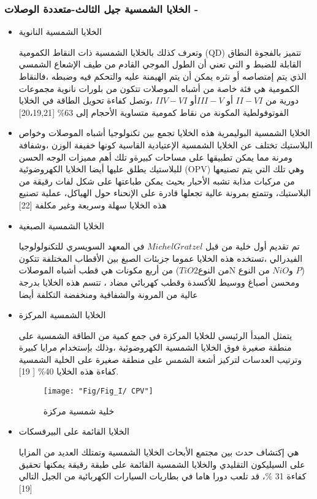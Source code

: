 	\subsubsection{ الخلايا الشمسية جيل الثالث-متعددة الوصلات - }
	\begin{itemize}
		
		\item   الخلايا الشمسية  النانوية 
		
		وتعرف كذلك بالخلايا الشمسية ذات النقاط الكمومية (QD) تتميز بالفجوة النطاق القابلة للضبط  و التي تعني أن الطول الموجي القادم من طيف الإشعاع الشمسي الذي يتم إمتصاصه أو نثره يمكن أن يتم الهيمنة عليه والتحكم فيه وضبطه ،فالنقاط الكمومية هي فئة خاصة من أشباه الموصلات تتكون من بلورات نانوية مجموعات دورية من $ II-VI $ أو $ III-V  $أو  $  IIV-VI$  ،وتصل كفاءة تحويل الطاقة في الخلايا الفوتوفولطية المكونة من نقاط كمومية متساوية الأحجام إلى 63\%
		[20،19,21]
		\item  الخلايا الشمسية البوليمرية 
		هذه الخلايا تجمع بين تكنولوجيا أشباه الموصلات وخواص البلاستيك تختلف عن الخلايا الشمسية الإعتيادية القاسية كونها خفيفة الوزن ،وشفافة ومرنة مما يمكن تطبيقها على مساحات كبيرةو تلك أهم مميزات الوجه الحسن للبلاستيك 
		يطلق عليها أيضا الخلايا الكهروضوئية (OPV) وهي تلك التي يتم تصنيعها من مركبات مذابة تشبه الأحبار بحيث يمكن طباعتها على شكل لفات رقيقة من البلاستيك، وتتمتع بمرونة عالية تجعلها قادرة على الإنحناء حول الهياكل، عملية تصنيع هذه الخلايا سهلة وسريعة وغير مكلفة
		[22]
		\item   الخلايا الشمسية الصبغية  
		
		تم تقديم أول خلية من قبل $ Michel Gratzel $ في المعهد السويسري للتكنولولوجيا الفيدرالي ،تستخده هذه الخلايا عموما جزبئات الصبغ بين الأقطاب المختلفة تتكون من أربع مكونات هي قطب أشباه الموصلات   ($ TiO2 $من النوع$   $N و$ NiO $ من النوع $ P  $) ومحسن أصباغ ووسيط للأكسدة وقطب كهربائي مضاد ، تتسم هذه الخلايا بدرجة عالية من المرونة والشفافية ومنخفضة التكلفة أيضا 
		\item  الخلايا الشمسية المركزة 
		
		يتمثل المبدأ الرئيسي للخلايا المركزة في جمع كمية من الطاقة الشمسية على منطقة صغيرة فوق الخلايا الشمسية الكهروضوئية ،وذلك بإستخدام مرايا كبيرة وترتيب العدسات لتركيز أشعة الشمس على منطقة صغيرة على الخلية الشمسية كفاءة هذه الخلايا 40\% [ 19].
		\begin{figure}[h!]
			\centering
			\texttt{[image: "Fig/Fig\_I/ CPV"]}
			\caption{خلية شمسية مركزة}
			\label{fig:-cpv}
		\end{figure}
		\FloatBarrier			
		
		\item  الخلايا القائمة على البيرفسكات 
		
		هي إكتشاف حدث بين مجتمع الأبحاث الخلايا الشمسية وتمتلك العديد من المزايا على السيليكون التقليدي والخلايا الشمسية القائمة على طبقة رقيقة يمكنها تحقيق كفاءة 31 \%، قد تلعب دورا هاما في بطاريات السيارات الكهربائية من الجيل التالي
		[19]
	\end{itemize}
